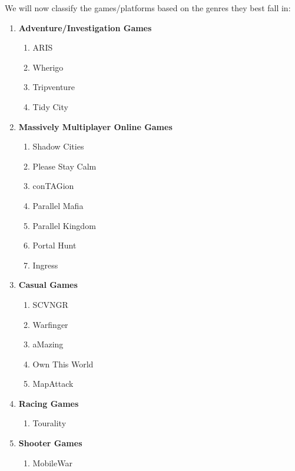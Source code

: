 \documentclass{article}
\begin{document}
We will now classify the games/platforms based on the genres they best fall in:

\begin{enumerate}
  \item \textbf{Adventure/Investigation Games}
  		\begin{enumerate}
  	  		\item ARIS
  	  		\item Wherigo
  	  		\item Tripventure
  	  		\item Tidy City	  
  		\end{enumerate}
  		
  \item \textbf{Massively Multiplayer Online Games}
  		\begin{enumerate}
  	  		\item Shadow Cities
  	  		\item Please Stay Calm
  	  		\item conTAGion
  	  		\item Parallel Mafia
  	  		\item Parallel Kingdom
  	  		\item Portal Hunt
  	  		\item Ingress
  		\end{enumerate}
  		
  \item \textbf{Casual Games}
  		\begin{enumerate}
  	  		\item SCVNGR
  	  		\item Warfinger  	  		
  	  		\item aMazing 	
  	  		\item Own This World
  	  		\item MapAttack	  	  		
  		\end{enumerate}
  		  		  		
  \item \textbf{Racing Games}
  		\begin{enumerate}
  	  		\item Tourality  	  		 	  		  	  		
  		\end{enumerate}
  		
  \item \textbf{Shooter Games}
  		\begin{enumerate}
  	  		\item MobileWar	  		  	  		
  		\end{enumerate}  
\end{enumerate}
\end{document}
